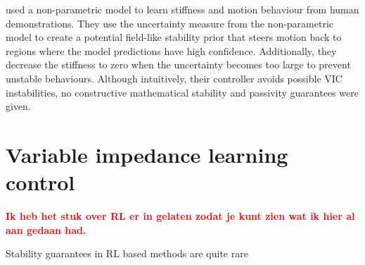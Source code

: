 \cite{franzeseILoSAInteractiveLearning2021} used a non-parametric model to learn stiffness and motion behaviour from human demonstrations. They use the uncertainty measure from the non-parametric model to create a potential field-like stability prior that steers motion back to regions where the model predictions have high confidence. Additionally, they decrease the stiffness to zero when the uncertainty becomes too large to prevent unstable behaviours. Although intuitively, their controller avoids possible VIC instabilities, no constructive mathematical stability and passivity guarantees were given.

\section{Variable impedance learning control}


\textbf{\textcolor{red}{Ik heb het stuk over RL er in gelaten zodat je kunt zien wat ik hier al aan gedaan had.}}

Stability guarantees in RL based methods are quite rare \cite{abdulkhaderDataDrivenMethodsContactRich2021}


